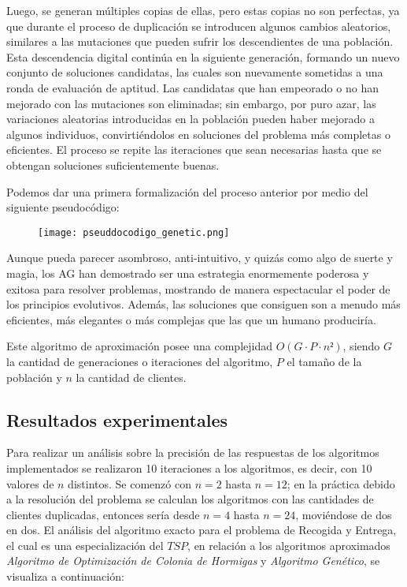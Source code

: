\documentclass[twocolumn, fontsize=10pt]{article}
\theoremstyle{definition} %
\begin{document}
Luego, se generan múltiples copias de ellas, pero estas copias no son perfectas, ya que durante el proceso de duplicación se introducen algunos cambios aleatorios, similares a las mutaciones que pueden sufrir los descendientes de una población. Esta descendencia digital continúa en la siguiente generación, formando un nuevo conjunto de soluciones candidatas, las cuales son nuevamente sometidas a una ronda de evaluación de aptitud. Las candidatas que han empeorado o no han mejorado con las mutaciones son eliminadas; sin embargo, por puro azar, las variaciones aleatorias introducidas en la población pueden haber mejorado a algunos individuos, convirtiéndolos en soluciones del problema más completas o eficientes. El proceso se repite las iteraciones que sean necesarias hasta que se obtengan soluciones suficientemente buenas.

Podemos dar una primera formalización del proceso anterior por medio del siguiente pseudocódigo: 

\begin{figure}[h]
    \centering
    \texttt{[image: pseuddocodigo\_genetic.png]}
    \label{fig:gadget}
\end{figure}

Aunque pueda parecer asombroso, anti-intuitivo, y quizás como algo de suerte y magia, los AG han demostrado ser una estrategia enormemente poderosa y exitosa para resolver problemas, mostrando de manera espectacular el poder de los principios evolutivos. Además, las soluciones que consiguen son a menudo más eficientes, más elegantes o más complejas que las que un humano produciría. 

Este algoritmo de aproximación posee una complejidad \(O(G \cdot P \cdot n²)\), siendo \(G\) la cantidad de generaciones o iteraciones del algoritmo, \(P\) el tamaño de la población y \(n\) la cantidad de clientes.

\subsection{Resultados experimentales}

Para realizar un análisis sobre la precisión de las respuestas de los algoritmos implementados se realizaron 10 iteraciones a los algoritmos, es decir, con 10 valores de \(n\) distintos. Se comenzó con \(n=2\) hasta \(n=12\); en la práctica debido a la resolución del problema se calculan los algoritmos con las cantidades de clientes duplicadas, entonces sería desde \(n=4\) hasta \(n=24\), moviéndose de dos en dos. El análisis del algoritmo exacto para el problema de Recogida y Entrega, el cual es una especialización del \(TSP\), en relación a los algoritmos aproximados \textit{Algoritmo de Optimización de Colonia de Hormigas} y \textit{Algoritmo Genético}, se visualiza a continuación:
\end{document}
